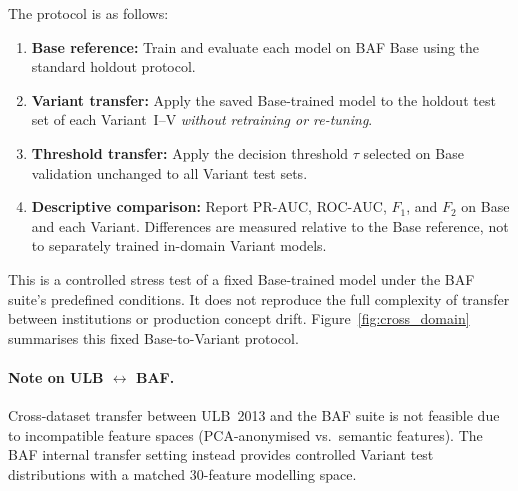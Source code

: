 The protocol is as follows:
\begin{enumerate}
  \item \textbf{Base reference:} Train and evaluate each model on BAF Base using the standard holdout protocol.
  \item \textbf{Variant transfer:} Apply the saved Base-trained model to the holdout test set of each Variant~I--V \emph{without retraining or re-tuning}.
  \item \textbf{Threshold transfer:} Apply the decision threshold $\tau$ selected on Base validation unchanged to all Variant test sets.
  \item \textbf{Descriptive comparison:} Report PR-AUC, ROC-AUC, $F_1$, and $F_2$ on Base and each Variant. Differences are measured relative to the Base reference, not to separately trained in-domain Variant models.
\end{enumerate}

This is a controlled stress test of a fixed Base-trained model under the BAF suite's predefined conditions. It does not reproduce the full complexity of transfer between institutions or production concept drift. Figure~\ref{fig:cross_domain} summarises this fixed Base-to-Variant protocol.

\paragraph{Note on ULB \texorpdfstring{$\leftrightarrow$}{<->} BAF.}
Cross-dataset transfer between ULB~2013 and the BAF suite is not feasible due to incompatible feature spaces (PCA-anonymised vs.\ semantic features). The BAF internal transfer setting instead provides controlled Variant test distributions with a matched 30-feature modelling space.


